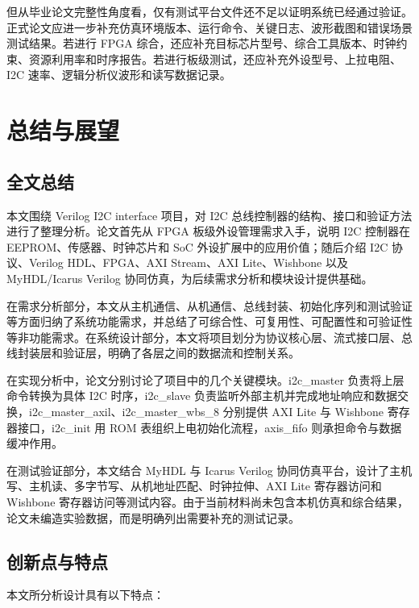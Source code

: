\documentclass[12pt,a4paper]{article}
\numberwithin{equation}{section}
\begin{document}
但从毕业论文完整性角度看，仅有测试平台文件还不足以证明系统已经通过验证。正式论文应进一步补充仿真环境版本、运行命令、关键日志、波形截图和错误场景测试结果。若进行
FPGA
综合，还应补充目标芯片型号、综合工具版本、时钟约束、资源利用率和时序报告。若进行板级测试，还应补充外设型号、上拉电阻、I2C
速率、逻辑分析仪波形和读写数据记录。

\section{总结与展望}\label{ux603bux7ed3ux4e0eux5c55ux671b}

\subsection{全文总结}\label{ux5168ux6587ux603bux7ed3}

本文围绕 Verilog I2C interface 项目，对 I2C
总线控制器的结构、接口和验证方法进行了整理分析。论文首先从 FPGA
板级外设管理需求入手，说明 I2C 控制器在 EEPROM、传感器、时钟芯片和 SoC
外设扩展中的应用价值；随后介绍 I2C 协议、Verilog HDL、FPGA、AXI
Stream、AXI Lite、Wishbone 以及 MyHDL/Icarus Verilog
协同仿真，为后续需求分析和模块设计提供基础。

在需求分析部分，本文从主机通信、从机通信、总线封装、初始化序列和测试验证等方面归纳了系统功能需求，并总结了可综合性、可复用性、可配置性和可验证性等非功能需求。在系统设计部分，本文将项目划分为协议核心层、流式接口层、总线封装层和验证层，明确了各层之间的数据流和控制关系。

在实现分析中，论文分别讨论了项目中的几个关键模块。i2c\_master
负责将上层命令转换为具体 I2C 时序，i2c\_slave
负责监听外部主机并完成地址响应和数据交换，i2c\_master\_axil、i2c\_master\_wbs\_8
分别提供 AXI Lite 与 Wishbone
寄存器接口，i2c\_init 用 ROM
表组织上电初始化流程，axis\_fifo
则承担命令与数据缓冲作用。

在测试验证部分，本文结合 MyHDL 与 Icarus Verilog
协同仿真平台，设计了主机写、主机读、多字节写、从机地址匹配、时钟拉伸、AXI
Lite 寄存器访问和 Wishbone
寄存器访问等测试内容。由于当前材料尚未包含本机仿真和综合结果，论文未编造实验数据，而是明确列出需要补充的测试记录。

\subsection{创新点与特点}\label{ux521bux65b0ux70b9ux4e0eux7279ux70b9}

本文所分析设计具有以下特点：
\end{document}

